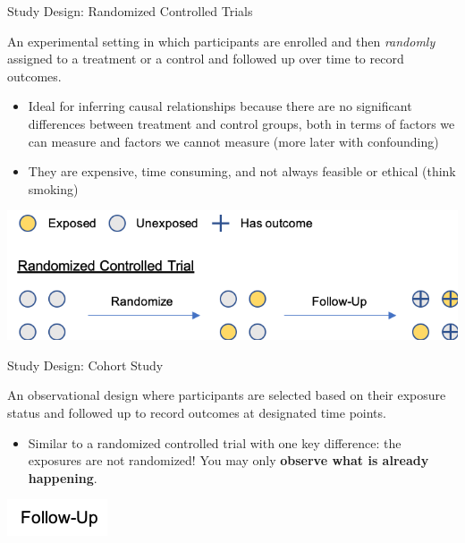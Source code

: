 \documentclass[ignorenonframetext,]{beamer}
\providecommand{\tightlist}{%
  \setlength{\itemsep}{0pt}\setlength{\parskip}{0pt}}
\begin{document}
\begin{frame}{Study Design: Randomized Controlled Trials}
\protect\hypertarget{study-design-randomized-controlled-trials}{}

An experimental setting in which participants are enrolled and then
\emph{randomly} assigned to a treatment or a control and followed up
over time to record outcomes.

\begin{itemize}
\tightlist
\item
  Ideal for inferring causal relationships because there are no
  significant differences between treatment and control groups, both in
  terms of factors we can measure and factors we cannot measure (more
  later with confounding)
\item
  They are expensive, time consuming, and not always feasible or ethical
  (think smoking)
\end{itemize}

\includegraphics{../media/study-design-rct.png}

\end{frame}

\begin{frame}{Study Design: Cohort Study}
\protect\hypertarget{study-design-cohort-study}{}

An observational design where participants are selected based on their
exposure status and followed up to record outcomes at designated time
points.

\begin{itemize}
\tightlist
\item
  Similar to a randomized controlled trial with one key difference: the
  exposures are not randomized! You may only \textbf{observe what is
  already happening}.
\end{itemize}

\includegraphics{../media/study-design-cohort.png}

\end{frame}
\end{document}
